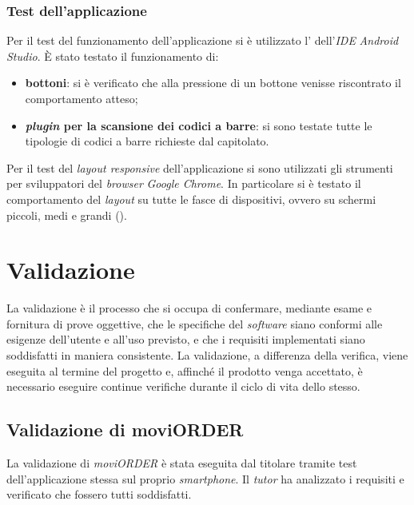 \subsubsection{Test dell'applicazione}

Per il test del funzionamento dell'applicazione si è utilizzato l' dell'\textit{IDE} \textit{Android Studio}. È stato testato il funzionamento di:
\begin{itemize}
	\item \textbf{bottoni}: si è verificato che alla pressione di un bottone venisse riscontrato il comportamento atteso;
	\item \textbf{\textit{plugin} per la scansione dei codici a barre}: si sono testate tutte le tipologie di codici a barre richieste dal capitolato.
\end{itemize}

Per il test del \textit{layout responsive} dell'applicazione si sono utilizzati gli strumenti per sviluppatori del \textit{browser} \textit{Google Chrome}. In particolare si è testato il comportamento del \textit{layout} su tutte le fasce di dispositivi, ovvero su schermi piccoli, medi e grandi ().

\section{Validazione}

La validazione è il processo che si occupa di confermare, mediante esame e fornitura di prove oggettive, che le specifiche del \textit{software} siano conformi alle esigenze dell'utente e all'uso previsto, e che i requisiti implementati siano soddisfatti in maniera consistente.
La validazione, a differenza della verifica, viene eseguita al termine del progetto e, affinché il prodotto venga accettato, è necessario eseguire continue verifiche durante il ciclo di vita dello stesso.

\subsection{Validazione di moviORDER}

La validazione di \textit{moviORDER} è stata eseguita dal titolare tramite test dell'applicazione stessa sul proprio \textit{smartphone}. Il \textit{tutor} ha analizzato i requisiti e verificato che fossero tutti soddisfatti.